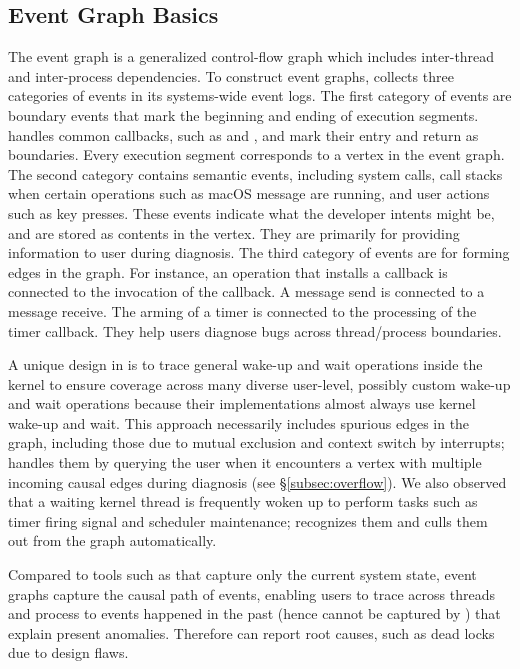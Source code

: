 \subsection{Event Graph Basics}\label{subsec:eventgraph}

The event graph is a generalized control-flow graph which includes inter-thread
and inter-process dependencies. To construct event graphs, \xxx collects three
categories of events in its systems-wide event logs. The first category of
events are boundary events that mark the beginning and ending of execution
segments.  \xxx handles common callbacks, such as
 and , and mark their entry
and return as boundaries.  Every execution segment corresponds to a vertex in
the event graph.  The second category contains semantic events, including
system calls, call stacks when certain operations such as macOS message are
running, and user actions such as key presses. These events indicate what the
developer intents might be, and are stored as contents in the vertex. They are
primarily for providing information to user during diagnosis. The third
category of events are for forming edges in the graph. For instance, an
operation that installs a callback is connected to the invocation of the
callback. A message send is connected to a message receive. The arming of a
timer is connected to the processing of the timer callback. They help users
diagnose bugs across thread/process boundaries.

A unique design in \xxx is to trace general wake-up and wait operations inside
the kernel to ensure coverage across many diverse user-level, possibly custom
wake-up and wait operations because their implementations almost always use
kernel wake-up and wait. This approach necessarily includes spurious edges
in the graph, including those due to mutual exclusion and context switch by
interrupts; \xxx handles them by querying the user when it encounters a vertex
with multiple incoming causal edges during diagnosis (see \S\ref{subsec:overflow}).
We also observed that a waiting kernel thread is frequently woken up to perform
tasks such as timer firing signal and scheduler maintenance; \xxx recognizes
them and culls them out from the graph automatically.

Compared to tools such as \spindump that capture only the current system state,
event graphs capture the causal path of events, enabling users to trace across
threads and process to events happened in the past (hence cannot be captured by
\spindump) that explain present anomalies. Therefore \xxx can report
root causes, such as dead locks due to design flaws.

